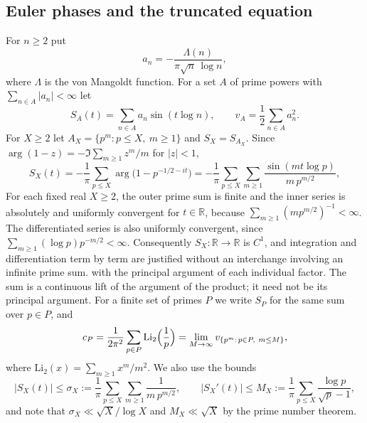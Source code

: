 \documentclass[11pt,reqno]{amsart}
\theoremstyle{plain}\newtheorem{theorem}{Theorem}[section]\newtheorem{proposition}[theorem]{Proposition}\newtheorem{lemma}[theorem]{Lemma}\newtheorem{corollary}[theorem]{Corollary}
\theoremstyle{definition}\newtheorem{hypothesis}[theorem]{Hypothesis}\newtheorem{definition}[theorem]{Definition}
\theoremstyle{remark}\newtheorem{remark}[theorem]{Remark}\newtheorem{experiment}[theorem]{Experiment}\newtheorem{question}[theorem]{Question}\newtheorem{heuristic}[theorem]{Heuristic}\newtheorem{conjecture}[theorem]{Conjecture}
\begin{document}
\subsection{Euler phases and the truncated equation}
\label{subsec:euler_phase}
For $n\ge2$ put
\begin{equation}
a_n=-\frac{\Lambda(n)}{\pi\sqrt n\,\log n},
\label{eq:an_def}
\end{equation}
where $\Lambda$ is the von Mangoldt function. For a set $A$ of prime powers with $\sum_{n\in A}|a_n|<\infty$ let
\begin{equation}
S_A(t)=\sum_{n\in A}a_n\sin(t\log n),\qquad v_A=\frac12\sum_{n\in A}a_n^2 .
\label{eq:SA_def}
\end{equation}
For $X\ge2$ let $A_X=\{p^m:p\le X,\ m\ge1\}$ and $S_X=S_{A_X}$. Since $\arg(1-z)=-\Im\sum_{m\ge1}z^m/m$ for $|z|<1$,
\begin{equation}
S_X(t)=-\frac1\pi\sum_{p\le X}\arg\bigl(1-p^{-1/2-it}\bigr)=-\frac1\pi\sum_{p\le X}\sum_{m\ge1}\frac{\sin(mt\log p)}{m\,p^{m/2}},
\label{eq:SX_def}
\end{equation}
For each fixed real $X\ge2$, the outer prime sum is finite and the inner series is absolutely and uniformly convergent for $t\in\mathbb R$, because $\sum_{m\ge1}(m p^{m/2})^{-1}<\infty$.  The differentiated series is also uniformly convergent, since $\sum_{m\ge1}(\log p)p^{-m/2}<\infty$.  Consequently $S_X:\mathbb R\to\mathbb R$ is $C^1$, and integration and differentiation term by term are justified without an interchange involving an infinite prime sum.
with the principal argument of each individual factor. The sum is a continuous lift of the argument of the product; it need not be its principal argument. For a finite set of primes $P$ we write $S_P$ for the same sum over $p\in P$, and
\begin{equation}
c_P=\frac1{2\pi^2}\sum_{p\in P}\mathrm{Li}_2\Bigl(\frac1p\Bigr)=\lim_{M\to\infty}v_{\{p^m:\,p\in P,\ m\le M\}},
\label{eq:cP_def}
\end{equation}
where $\mathrm{Li}_2(x)=\sum_{m\ge1}x^m/m^2$. We also use the bounds
\begin{equation}
|S_X(t)|\le\sigma_X:=\frac1\pi\sum_{p\le X}\sum_{m\ge1}\frac1{m\,p^{m/2}},\qquad |S_X'(t)|\le M_X:=\frac1\pi\sum_{p\le X}\frac{\log p}{\sqrt p-1},
\label{eq:sigma_M_def}
\end{equation}
and note that $\sigma_X\ll\sqrt X/\log X$ and $M_X\ll\sqrt X$ by the prime number theorem.
\end{document}
